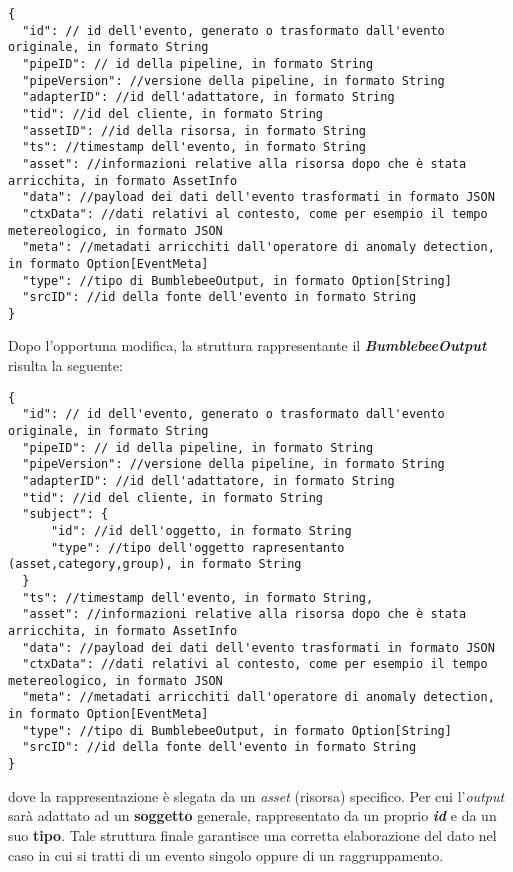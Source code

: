 \begin{verbatim}
{
  "id": // id dell'evento, generato o trasformato dall'evento originale, in formato String
  "pipeID": // id della pipeline, in formato String
  "pipeVersion": //versione della pipeline, in formato String
  "adapterID": //id dell'adattatore, in formato String
  "tid": //id del cliente, in formato String
  "assetID": //id della risorsa, in formato String
  "ts": //timestamp dell'evento, in formato String
  "asset": //informazioni relative alla risorsa dopo che è stata arricchita, in formato AssetInfo
  "data": //payload dei dati dell'evento trasformati in formato JSON
  "ctxData": //dati relativi al contesto, come per esempio il tempo metereologico, in formato JSON
  "meta": //metadati arricchiti dall'operatore di anomaly detection, in formato Option[EventMeta]
  "type": //tipo di BumblebeeOutput, in formato Option[String]
  "srcID": //id della fonte dell'evento in formato String
}
\end{verbatim}

Dopo l'opportuna modifica, la struttura rappresentante il \textbf{\textit{BumblebeeOutput}} risulta la seguente:

\begin{verbatim}
{
  "id": // id dell'evento, generato o trasformato dall'evento originale, in formato String
  "pipeID": // id della pipeline, in formato String
  "pipeVersion": //versione della pipeline, in formato String
  "adapterID": //id dell'adattatore, in formato String
  "tid": //id del cliente, in formato String
  "subject": {
	  "id": //id dell'oggetto, in formato String
	  "type": //tipo dell'oggetto rapresentanto (asset,category,group), in formato String
  }
  "ts": //timestamp dell'evento, in formato String,
  "asset": //informazioni relative alla risorsa dopo che è stata arricchita, in formato AssetInfo
  "data": //payload dei dati dell'evento trasformati in formato JSON
  "ctxData": //dati relativi al contesto, come per esempio il tempo metereologico, in formato JSON
  "meta": //metadati arricchiti dall'operatore di anomaly detection, in formato Option[EventMeta]
  "type": //tipo di BumblebeeOutput, in formato Option[String]
  "srcID": //id della fonte dell'evento in formato String
}
\end{verbatim}
dove la rappresentazione è slegata da un \textit{asset} (risorsa) specifico. Per cui l'\textit{output} sarà adattato ad un \textbf{soggetto} generale, rappresentato da un proprio \textbf{\textit{id}} e da un suo \textbf{tipo}.
Tale struttura finale garantisce una corretta elaborazione del dato nel caso in cui si tratti di un evento singolo oppure di un raggruppamento.

